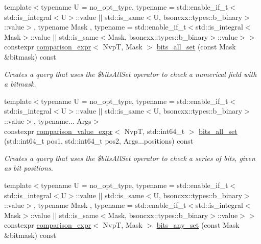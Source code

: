 \begin{DoxyCompactItemize}
{\footnotesize template$<$typename U  = no\+\_\+opt\+\_\+type, typename  = std\+::enable\+\_\+if\+\_\+t$<$std\+::is\+\_\+integral$<$\+U$>$\+::value $\vert$$\vert$                                          std\+::is\+\_\+same$<$\+U, bsoncxx\+::types\+::b\+\_\+binary$>$\+::value$>$, typename Mask , typename  = std\+::enable\+\_\+if\+\_\+t$<$std\+::is\+\_\+integral$<$\+Mask$>$\+::value $\vert$$\vert$                                          std\+::is\+\_\+same$<$\+Mask, bsoncxx\+::types\+::b\+\_\+binary$>$\+::value$>$$>$ }\\constexpr \hyperlink{classmangrove_1_1comparison__expr}{comparison\+\_\+expr}$<$ NvpT, Mask $>$ \hyperlink{classmangrove_1_1nvp__base_a4f21be175d0af1329d27137dad843d41}{bits\+\_\+all\+\_\+set} (const Mask \&bitmask) const 
\begin{DoxyCompactList}\small\item\em Creates a query that uses the \$bits\+All\+Set operator to check a numerical field with a bitmask. \end{DoxyCompactList}\item 
{\footnotesize template$<$typename U  = no\+\_\+opt\+\_\+type, typename  = std\+::enable\+\_\+if\+\_\+t$<$std\+::is\+\_\+integral$<$\+U$>$\+::value $\vert$$\vert$                                          std\+::is\+\_\+same$<$\+U, bsoncxx\+::types\+::b\+\_\+binary$>$\+::value$>$, typename... Args$>$ }\\constexpr \hyperlink{classmangrove_1_1comparison__value__expr}{comparison\+\_\+value\+\_\+expr}$<$ NvpT, std\+::int64\+\_\+t $>$ \hyperlink{classmangrove_1_1nvp__base_a761062eb92207fa8c42c6740e9549139}{bits\+\_\+all\+\_\+set} (std\+::int64\+\_\+t pos1, std\+::int64\+\_\+t pos2, Args...\+positions) const 
\begin{DoxyCompactList}\small\item\em Creates a query that uses the \$bits\+All\+Set operator to check a series of bits, given as bit positions. \end{DoxyCompactList}\item 
{\footnotesize template$<$typename U  = no\+\_\+opt\+\_\+type, typename  = std\+::enable\+\_\+if\+\_\+t$<$std\+::is\+\_\+integral$<$\+U$>$\+::value $\vert$$\vert$                                          std\+::is\+\_\+same$<$\+U, bsoncxx\+::types\+::b\+\_\+binary$>$\+::value$>$, typename Mask , typename  = std\+::enable\+\_\+if\+\_\+t$<$std\+::is\+\_\+integral$<$\+Mask$>$\+::value $\vert$$\vert$                                          std\+::is\+\_\+same$<$\+Mask, bsoncxx\+::types\+::b\+\_\+binary$>$\+::value$>$$>$ }\\constexpr \hyperlink{classmangrove_1_1comparison__expr}{comparison\+\_\+expr}$<$ NvpT, Mask $>$ \hyperlink{classmangrove_1_1nvp__base_a59ea684f00c07cf88bae76e6fc10cfc9}{bits\+\_\+any\+\_\+set} (const Mask \&bitmask) const 

\end{DoxyCompactItemize}
